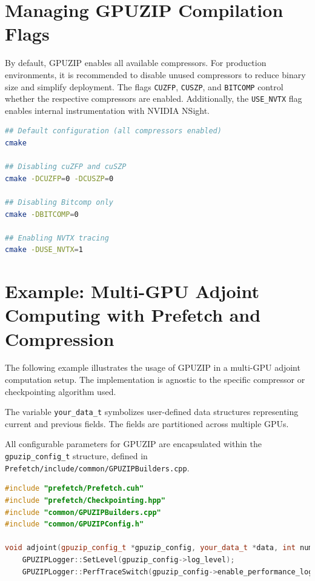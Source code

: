 \documentclass[Ingles,Final]{ic-tese-v3}
\begin{document}
\begin{appendices}{}
\section{Managing GPUZIP Compilation Flags}

By default, GPUZIP enables all available compressors. For production environments, it is recommended to disable unused compressors to reduce binary size and simplify deployment. The flags \texttt{CUZFP}, \texttt{CUSZP}, and \texttt{BITCOMP} control whether the respective compressors are enabled. Additionally, the \texttt{USE\_NVTX} flag enables internal instrumentation with NVIDIA NSight.

\begin{lstlisting}[language=bash, caption={Example of CMake flags usage}, label={lst:cmakeflags}]
## Default configuration (all compressors enabled)
cmake 

## Disabling cuZFP and cuSZP
cmake -DCUZFP=0 -DCUSZP=0

## Disabling Bitcomp only
cmake -DBITCOMP=0

## Enabling NVTX tracing
cmake -DUSE_NVTX=1
\end{lstlisting}

\section{Example: Multi-GPU Adjoint Computing with Prefetch and Compression}

The following example illustrates the usage of GPUZIP in a multi-GPU adjoint computation setup. The implementation is agnostic to the specific compressor or checkpointing algorithm used.

The variable \texttt{your\_data\_t} symbolizes user-defined data structures representing current and previous fields. The fields are partitioned across multiple GPUs.

All configurable parameters for GPUZIP are encapsulated within the \texttt{gpuzip\_config\_t} structure, defined in \texttt{Prefetch/include/common/GPUZIPBuilders.cpp}.

\begin{lstlisting}[language=C++, caption={Example of multi-GPU adjoint computation with GPUZIP}, label={lst:adjoint}]
#include "prefetch/Prefetch.cuh"
#include "prefetch/Checkpointing.hpp"
#include "common/GPUZIPBuilders.cpp"
#include "common/GPUZIPConfig.h"

void adjoint(gpuzip_config_t *gpuzip_config, your_data_t *data, int num_gpus) {
    GPUZIPLogger::SetLevel(gpuzip_config->log_level);
    GPUZIPLogger::PerfTraceSwitch(gpuzip_config->enable_performance_log);


\end{lstlisting}
\end{appendices}
\end{document}
